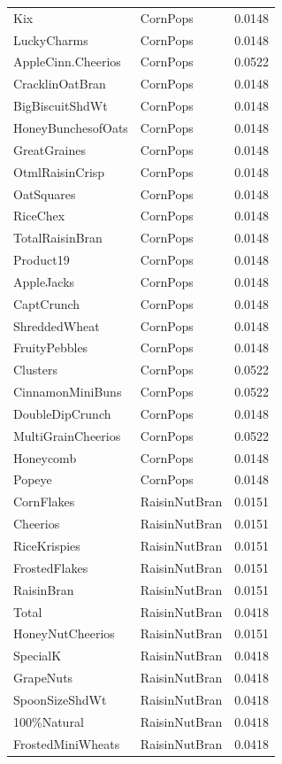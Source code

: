 \begin{table}[!htbp]
\begin{tabular}{lll}
\\
Kix & CornPops & 0.0148
\\
LuckyCharms & CornPops & 0.0148
\\
AppleCinn.Cheerios & CornPops & 0.0522
\\
CracklinOatBran & CornPops & 0.0148
\\
BigBiscuitShdWt & CornPops & 0.0148
\\
HoneyBunchesofOats & CornPops & 0.0148
\\
GreatGraines & CornPops & 0.0148
\\
OtmlRaisinCrisp & CornPops & 0.0148
\\
OatSquares & CornPops & 0.0148
\\
RiceChex & CornPops & 0.0148
\\
TotalRaisinBran & CornPops & 0.0148
\\
Product19 & CornPops & 0.0148
\\
AppleJacks & CornPops & 0.0148
\\
CaptCrunch & CornPops & 0.0148
\\
ShreddedWheat & CornPops & 0.0148
\\
FruityPebbles & CornPops & 0.0148
\\
Clusters & CornPops & 0.0522
\\
CinnamonMiniBuns & CornPops & 0.0522
\\
DoubleDipCrunch & CornPops & 0.0148
\\
MultiGrainCheerios & CornPops & 0.0522
\\
Honeycomb & CornPops & 0.0148
\\
Popeye & CornPops & 0.0148
\\
CornFlakes & RaisinNutBran & 0.0151
\\
Cheerios & RaisinNutBran & 0.0151
\\
RiceKrispies & RaisinNutBran & 0.0151
\\
FrostedFlakes & RaisinNutBran & 0.0151
\\
RaisinBran & RaisinNutBran & 0.0151
\\
Total & RaisinNutBran & 0.0418
\\
HoneyNutCheerios & RaisinNutBran & 0.0151
\\
SpecialK & RaisinNutBran & 0.0418
\\
GrapeNuts & RaisinNutBran & 0.0418
\\
SpoonSizeShdWt & RaisinNutBran & 0.0418
\\
100\%Natural & RaisinNutBran & 0.0418
\\
FrostedMiniWheats & RaisinNutBran & 0.0418

\end{tabular}
\end{table}
